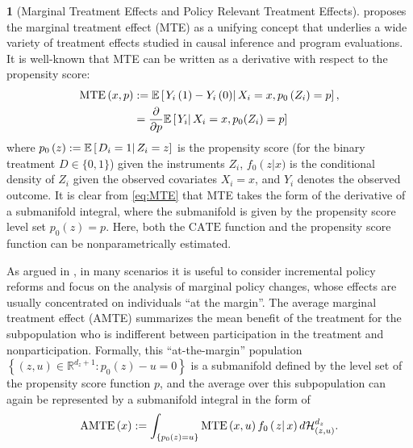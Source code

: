 \documentclass[12pt,american]{article}
\theoremstyle{definition}
\newtheorem{example}{\protect\examplename}
\theoremstyle{plain}
\theoremstyle{definition}
\theoremstyle{plain}
\theoremstyle{plain}
\theoremstyle{plain}
\theoremstyle{plain}
\theoremstyle{plain}
\newcommand{\R}{\mathbb{R}}
\newcommand{\E}{\mathbb{E}}
\providecommand{\examplename}{Example}
\providecommand{\examplename}{Example}
\begin{document}
\begin{example}[Marginal Treatment Effects and Policy Relevant Treatment Effects]
  \label{exa:MTE} \citet*{heckman2005structural,heckman2007econometric}
  proposes the marginal treatment effect (MTE) as a unifying concept
  that underlies a wide variety of treatment effects studied in causal
  inference and program evaluations. It is well-known that MTE can be
  written as a derivative with respect to the propensity score:
  \begin{align}
    \text{MTE}\left(x,p\right) & :=\E\left[\rest{Y_{i}\left(1\right)-Y_{i}\left(0\right)}X_{i}=x,p_{0}\left(Z_{i}\right)=p\right],\nonumber \\
    & = \frac{\p}{\p p}\E\left[\rest{Y_i} X_i= x, p_0(Z_i)=p\right]
    \label{eq:MTE}
  \end{align}
  where $p_{0}\left(z\right):=\E\left[\rest{D_{i}=1}Z_{i}=z\right]$
  is the propensity score (for the binary treatment $D\in\{0,1\}$) given the instruments $Z_{i}$, $f_{0}\left(z\right|x)$
  is the conditional density of $Z_{i}$ given the observed covariates $X_i=x$, and $Y_i$ denotes the observed outcome.
  It is clear from \eqref{eq:MTE} that MTE takes the form of the derivative of a submanifold integral,
  where the submanifold is given by the propensity score level set $p_{0}\left(z\right)=p$.
  Here, both the $\text{CATE}$ function and the propensity score function
  can be nonparametrically estimated.

  As argued in \citet*{carneiro2010evaluating}, in many scenarios it
  is useful to consider incremental policy reforms and focus on the
  analysis of marginal policy changes, whose effects are usually concentrated
  on individuals ``at the margin''. The average marginal treatment
  effect (AMTE) summarizes the mean benefit of the treatment for the
  subpopulation who is indifferent between participation in the treatment
  and nonparticipation. Formally, this ``at-the-margin'' population
  $\left\{ \left(z,u\right)\in\R^{d_{z}+1}:p_{0}\left(z\right)-u=0\right\} $ is a submanifold defined by the level set of the propensity score function $p$,
  and the average over this subpopulation can again be represented by
  a submanifold integral in the form of
  \[
    \text{AMTE}\left(x\right):=\int_{\left\{ p_{0}\left(z\right)=u\right\} }\text{MTE}\left(x,u\right)f_{0}\left(\left.z\right|x\right)d{\cal H}_{\left(z,u\right)}^{d_{z}}.
  \]


\end{example}
\end{document}

